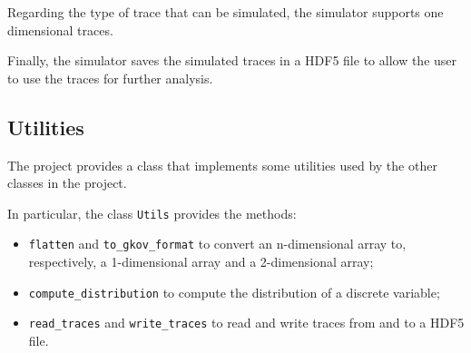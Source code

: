 \documentclass[12pt]{article}
\begin{document}
    Regarding the type of trace that can be simulated, the simulator supports one dimensional traces.

    Finally, the simulator saves the simulated traces in a HDF5 file to allow the user to use the traces for further analysis.

    \subsection{Utilities}\label{subsec:utils}
    The project provides a class that implements some utilities used by the other classes in the project.

    In particular, the class \texttt{Utils} provides the methods:
    \begin{itemize}
        \item \texttt{flatten} and \texttt{to\_gkov\_format} to convert an n-dimensional array to, respectively, a 1-dimensional array and a 2-dimensional array;
        \item \texttt{compute\_distribution} to compute the distribution of a discrete variable;
        \item \texttt{read\_traces} and \texttt{write\_traces} to read and write traces from and to a HDF5 file.
    \end{itemize}
    \newpage
    
    
\end{document}
